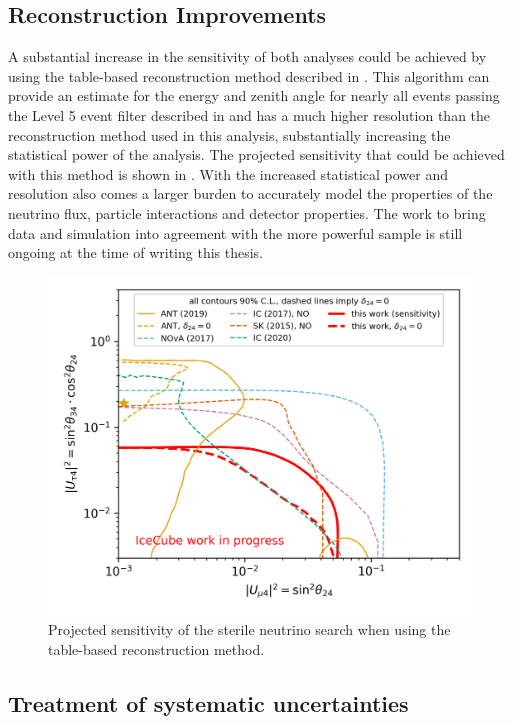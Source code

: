 \subsection{Reconstruction Improvements}
A substantial increase in the sensitivity of both analyses could be achieved by using the table-based reconstruction method described in \cite{lowen-reco-paper}. This algorithm can provide an estimate for the energy and zenith angle for nearly all events passing the Level 5 event filter described in  and has a much higher resolution than the reconstruction method used in this analysis, substantially increasing the statistical power of the analysis. The projected sensitivity that could be achieved with this method is shown in . With the increased statistical power and resolution also comes a larger burden to accurately model the properties of the neutrino flux, particle interactions and detector properties. The work to bring data and simulation into agreement with the more powerful sample is still ongoing at the time of writing this thesis.
\begin{figure}
    \centering
    \includegraphics[width=0.7\linewidth]{figures/summary/Sterile_mixing_sensitivity_90pct_retro.png}
    \caption{Projected sensitivity of the sterile neutrino search when using the table-based reconstruction method.\label{fig:retro-sensitivity}}
\end{figure}

\subsection{Treatment of systematic uncertainties}
